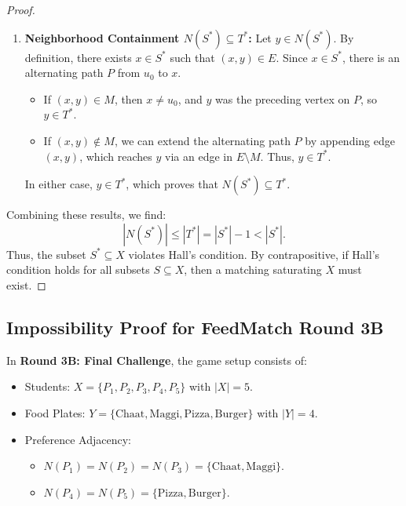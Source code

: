 \documentclass[11pt,a4paper]{article}
\begin{document}
\begin{proof}
\begin{enumerate}
  Conversely, every vertex $x \in S^* \setminus \{u_0\}$ is reached along an edge in $M$, meaning it is matched to some $y \in T^*$. Therefore, the matching $M$ defines a perfect bijection between $T^*$ and $S^* \setminus \{u_0\}$. This yields:
  \[
    |T^*| = |S^* \setminus \{u_0\}| = |S^*| - 1.
  \]
  \item \textbf{Neighborhood Containment $N(S^*) \subseteq T^*$:} Let $y \in N(S^*)$. By definition, there exists $x \in S^*$ such that $(x, y) \in E$. Since $x \in S^*$, there is an alternating path $P$ from $u_0$ to $x$. 
  \begin{itemize}
    \item If $(x, y) \in M$, then $x \ne u_0$, and $y$ was the preceding vertex on $P$, so $y \in T^*$.
    \item If $(x, y) \notin M$, we can extend the alternating path $P$ by appending edge $(x, y)$, which reaches $y$ via an edge in $E \setminus M$. Thus, $y \in T^*$.
  \end{itemize}
  In either case, $y \in T^*$, which proves that $N(S^*) \subseteq T^*$.
\end{enumerate}

Combining these results, we find:
\[
  |N(S^*)| \le |T^*| = |S^*| - 1 < |S^*|.
\]
Thus, the subset $S^* \subseteq X$ violates Hall's condition. By contrapositive, if Hall's condition holds for all subsets $S \subseteq X$, then a matching saturating $X$ must exist.
\end{proof}

\subsection*{Impossibility Proof for FeedMatch Round 3B}
In \textbf{Round 3B: Final Challenge}, the game setup consists of:
\begin{itemize}
  \item Students: $X = \{P_1, P_2, P_3, P_4, P_5\}$ with $|X| = 5$.
  \item Food Plates: $Y = \{\text{Chaat}, \text{Maggi}, \text{Pizza}, \text{Burger}\}$ with $|Y| = 4$.
  \item Preference Adjacency:
  \begin{itemize}
    \item $N(P_1) = N(P_2) = N(P_3) = \{\text{Chaat}, \text{Maggi}\}$.
    \item $N(P_4) = N(P_5) = \{\text{Pizza}, \text{Burger}\}$.
  \end{itemize}
\end{itemize}
\end{document}
